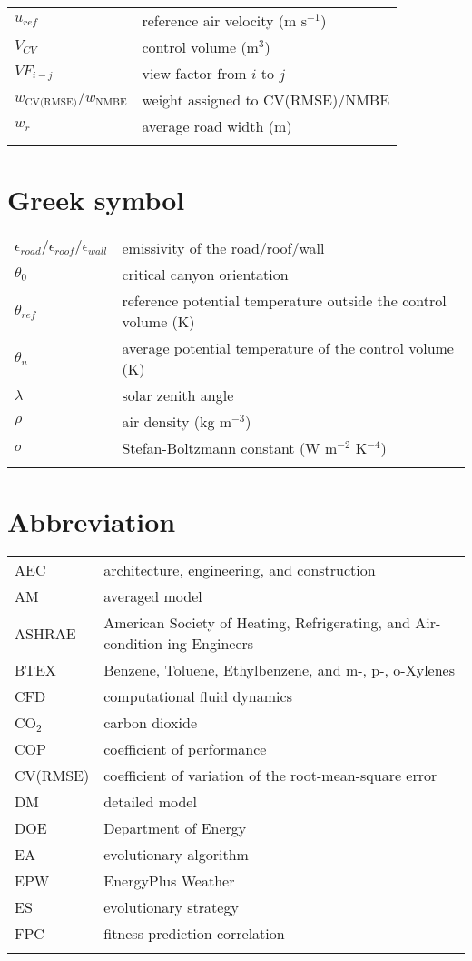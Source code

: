 \noindent
\begin{tabular}{p{3.5cm}p{11.5cm}}
$u_{ref}$ & reference air velocity (m s$^{-1}$)\\
$V_{CV}$ & control volume (m$^3$)\\
$VF_{i-j}$ & view factor from $i$ to $j$\\
$w_{\textrm{CV(RMSE)}}/w_{\textrm{NMBE}}$ & weight assigned to CV(RMSE)/NMBE \\
$w_r$ & average road width (m)\\
\multicolumn{2}{c}{}
\end{tabular}


\section*{Greek symbol}

\begin{tabular}{p{3.5cm}p{11.5cm}}
$\epsilon_{road}/\epsilon_{roof}/\epsilon_{wall}$ & emissivity of the road/roof/wall \\
$\theta_0$ & critical canyon orientation \\
$\theta_{ref}$ & reference potential temperature outside the control volume (K)\\
$\theta_u$ & average potential temperature of the control volume (K)\\
$\lambda$ & solar zenith angle\\
$\rho$ & air density (kg m$^{-3}$)\\
$\sigma$ & Stefan-Boltzmann constant (W m$^{-2}$ K$^{-4}$) \\
\multicolumn{2}{c}{}
\end{tabular}

\section*{Abbreviation}

\begin{tabular}{p{3.5cm}p{11.5cm}}
AEC & architecture, engineering, and construction \\
AM & averaged model\\
ASHRAE & American Society of Heating, Refrigerating, and Air-condition-ing Engineers\\
BTEX & Benzene, Toluene, Ethylbenzene, and m-, p-, o-Xylenes\\
CFD & computational fluid dynamics \\
CO$_2$ & carbon dioxide\\
COP & coefficient of performance\\
CV(RMSE) & coefficient of variation of the root-mean-square error\\
DM & detailed model\\
DOE & Department of Energy\\
EA & evolutionary algorithm\\
EPW & EnergyPlus Weather\\
ES & evolutionary strategy \\
FPC & fitness prediction correlation\\
\multicolumn{2}{c}{}
\end{tabular}

